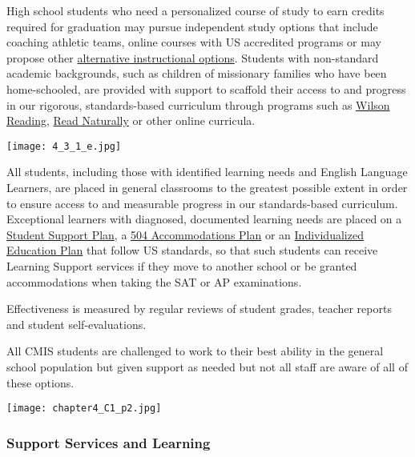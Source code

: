 \begin{findings}
High school students who need a personalized course of study to earn credits required for graduation may pursue independent study options that include coaching athletic teams, online courses with US accredited programs or may propose other \href{http://www.ck12.org/}{alternative instructional options}. Students with non-standard academic backgrounds, such as children of missionary families who have been home-schooled, are provided with support to scaffold their access to and progress in our rigorous, standards-based curriculum through programs such as \href{http://www.wilsonlanguage.com/programs/wilson-reading-system/}{Wilson Reading}, \href{https://www.readnaturally.com/}{Read Naturally} or other online curricula.

{\centering\texttt{[image: 4\_3\_1\_e.jpg]}}

All students, including those with identified learning needs and English Language Learners, are placed in general classrooms to the greatest possible extent in order to ensure access to and measurable progress in our standards-based curriculum. Exceptional learners with diagnosed, documented learning needs are placed on a \href{https://drive.google.com/drive/u/0/folders/0B_rFN7xA3AUNdlVaY2E1WGo1bUE}{Student Support Plan}, a \href{https://drive.google.com/drive/u/0/folders/0B_rFN7xA3AUNdlVaY2E1WGo1bUE}{504 Accommodations Plan} or an \href{https://drive.google.com/drive/u/0/folders/0B_rFN7xA3AUNdlVaY2E1WGo1bUE}{Individualized Education Plan} that follow US standards, so that such students can receive Learning Support services if they move to another school or be granted accommodations when taking the SAT or AP examinations. 

Effectiveness is measured by regular reviews of student grades, teacher reports and student self-evaluations.


All CMIS students are challenged to work to their best ability in the general school population but given support as needed but not all staff are aware of all of these options.
\end{findings}

{\centering\texttt{[image: chapter4\_C1\_p2.jpg]}}

\subsubsection{Support Services and Learning}

